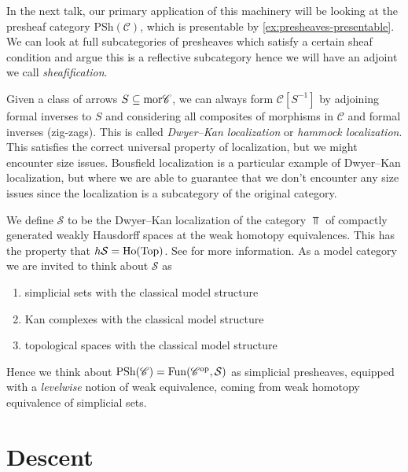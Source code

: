 \documentclass[11pt,openany]{book}
\renewcommand{\Pre}{\mathrm{PSh}}
\begin{document}
\begin{example} In the next talk, our primary application of this machinery will be looking at the presheaf category $\Pre(\mathscr{C})$, which is presentable by \autoref{ex:presheaves-presentable}. We can look at full subcategories of presheaves which satisfy a certain sheaf condition and argue this is a reflective subcategory hence we will have an adjoint we call \textit{sheafification}.
\end{example}

\begin{remark} Given a class of arrows $S \subseteq \mathrm{mor} \mathscr{C}$, we can always form $\mathscr{C}[S^{-1}]$ by adjoining formal inverses to $S$ and considering all composites of morphisms in $\mathscr{C}$ and formal inverses (zig-zags). This is called \textit{Dwyer--Kan localization} or \textit{hammock localization}. This satisfies the correct universal property of localization, but we might encounter size issues. Bousfield localization is a particular example of Dwyer--Kan localization, but where we are able to guarantee that we don't encounter any size issues since the localization is a subcategory of the original category.
\end{remark}


\begin{example} We define $\mathcal{S}$ to be the Dwyer--Kan localization of the category $\Top$ of compactly generated weakly Hausdorff spaces at the weak homotopy equivalences. This has the property that $h \mathcal{S} = \mathrm{Ho}(\mathrm{Top})$. See \cite[\S1.2.16]{HTT} for more information. As a model category we are invited to think about $\mathcal{S}$ as
\begin{enumerate}
    \item simplicial sets with the classical model structure
    \item Kan complexes with the classical model structure
    \item topological spaces with the classical model structure
\end{enumerate}
Hence we think about $\Pre(\mathscr{C}) = \Fun(\mathscr{C}^\op, \mathcal{S})$ as simplicial presheaves, equipped with a \textit{levelwise} notion of weak equivalence, coming from weak homotopy equivalence of simplicial sets.
\end{example}



\section{Descent}
\end{document}
